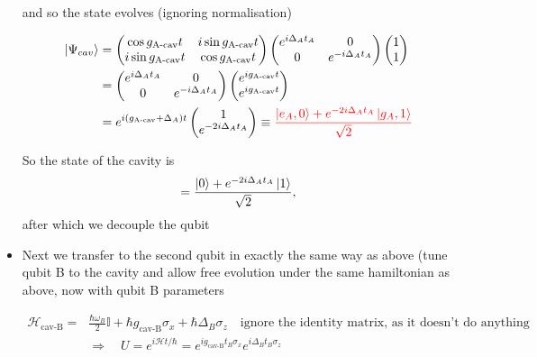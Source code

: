 \begin{itemize}
		\noindent and so the state evolves (ignoring normalisation)
		
		\[
			\begin{aligned}
			\Ket{\Psi_{cav}} &= 	\begin{pmatrix}
			\cos{g_\text{A-cav}t} & i\sin{g_\text{A-cav}t}\\i\sin{g_\text{A-cav}t}&\cos{g_\text{A-cav}t}
			\end{pmatrix} \begin{pmatrix}
				e^{i\Delta_A t_A} & 0\\0&e^{-i\Delta_A t_A}
				\end{pmatrix}
				\begin{pmatrix}
							1 \\1
				\end{pmatrix}\\
				& = \begin{pmatrix}
				e^{i\Delta_A t_A} & 0\\0&e^{-i\Delta_A t_A}
				\end{pmatrix}\begin{pmatrix}
				e^{ig_\text{A-cav}t} \\e^{ig_\text{A-cav}t}\\
				\end{pmatrix} \\
				& = e^{i(g_\text{A-cav}+\Delta_A)t} \begin{pmatrix}
				1 \\e^{-2i\Delta_A t_A}\\
				\end{pmatrix} \equiv {\color{red}{\frac{\ensuremath{\Ket{e_A,0}}+e^{-2i\Delta_A t_A}\ensuremath{\Ket{g_A,1}}}{\sqrt{2}}}}
			\end{aligned}
		\]
		
		So the state of the cavity is \[ =\frac{\Ket{0}+e^{-2i\Delta_A t_A}\Ket{1}}{\sqrt{2}}, \] after which we decouple the qubit
		
		\item  Next we transfer to the second qubit in exactly the same way as above (tune qubit B to the cavity and allow free evolution under the same hamiltonian as above, now with qubit B parameters
		
		\[
		\begin{aligned}
		\mathcal{H}_\text{cav-B} = & \frac{\hbar\omega_B}{2}\mathbb{I} + \hbar g_\text{cav-B}\sigma_x + \hbar\Delta_B\sigma_z\quad\text{ignore the identity matrix, as it doesn't do anything}\\
		& \Rightarrow \quad U = e^{i\mathcal{H}t/\hbar} = e^{ig_\text{cav-B}t_B\sigma_x}e^{i\Delta_B t_B\sigma_z}\\
		\end{aligned}
		\]
		

\end{itemize}
